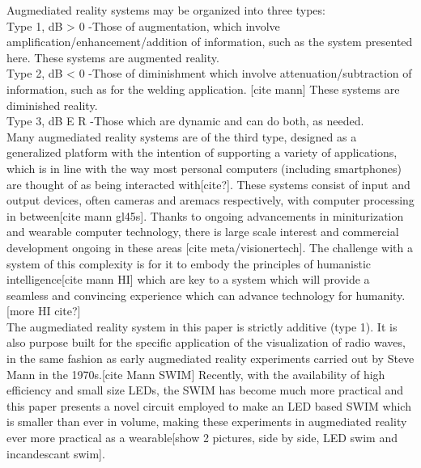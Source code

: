 \documentclass[conference]{IEEEtran}
\begin{document}
Augmediated reality systems may be organized into three types: \\

Type 1, dB > 0 -Those of augmentation, which involve amplification/enhancement/addition of information, such as the system presented here. These systems are augmented reality.\\
Type 2, dB < 0 -Those of diminishment which involve attenuation/subtraction of information, such as for the welding application. [cite mann] These systems are diminished reality.\\
Type 3, dB E R -Those which are dynamic and can do both, as needed.\\

Many augmediated reality systems are of the third type, designed as a generalized platform with the intention of supporting a variety of applications, which is in line with the way most personal computers (including smartphones) are thought of as being interacted with[cite?]. These systems consist of input and output devices, often cameras and aremacs respectively, with computer processing in between[cite mann gl45s]. Thanks to ongoing advancements in miniturization and wearable computer technology, there is large scale interest and commercial development ongoing in these areas [cite meta/visionertech]. The challenge with a system of this complexity is for it to embody the principles of humanistic intelligence[cite mann HI] which are key to a system which will provide a seamless and convincing experience which can advance technology for humanity.[more HI cite?]\\
The augmediated reality system in this paper is strictly additive (type 1). It is also purpose built for the specific application of the visualization of radio waves, in the same fashion as early augmediated reality experiments carried out by Steve Mann in the 1970s.[cite Mann SWIM] Recently, with the availability of high efficiency and small size LEDs, the SWIM has become much more practical and this paper presents a novel circuit employed to make an LED based SWIM which is smaller than ever in volume, making these experiments in augmediated reality ever more practical as a wearable[show 2 pictures, side by side, LED swim and incandescant swim].\\
\end{document}
